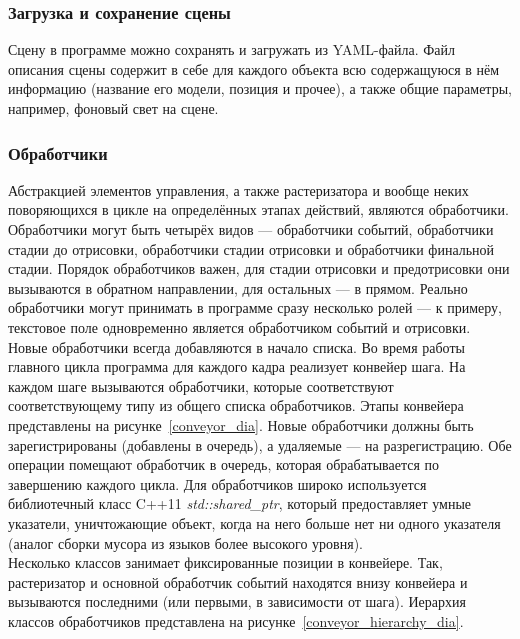 \documentclass[a4paper,12pt]{report}
\numberwithin{equation}{section}
\begin{document}
\subsubsection{Загрузка и сохранение сцены}
Сцену в программе можно сохранять и загружать из YAML-файла. Файл описания сцены содержит в себе для каждого объекта всю содержащуюся в нём информацию (название его модели, позиция и прочее), а также общие параметры, например, фоновый свет на сцене.

\subsubsection{Обработчики}
Абстракцией элементов управления, а также растеризатора и вообще неких поворяющихся в цикле на определённых этапах действий, являются обработчики. Обработчики могут быть четырёх видов --- обработчики событий, обработчики стадии до отрисовки, обработчики стадии отрисовки и обработчики финальной стадии. Порядок обработчиков важен, для стадии отрисовки и предотрисовки они вызываются в обратном направлении, для остальных --- в прямом. Реально обработчики могут принимать в программе сразу несколько ролей --- к примеру, текстовое поле одновременно является обработчиком событий и отрисовки. Новые обработчики всегда добавляются в начало списка. Во время работы главного цикла программа для каждого кадра реализует конвейер шага. На каждом шаге вызываются обработчики, которые соответствуют соответствующему типу из общего списка обработчиков. Этапы конвейера представлены на рисунке~\ref{conveyor_dia}. Новые обработчики должны быть зарегистрированы (добавлены в очередь), а удаляемые --- на разрегистрацию. Обе операции помещают обработчик в очередь, которая обрабатывается по завершению каждого цикла. Для обработчиков широко используется библиотечный класс C++11 \textit{std::shared\_ptr}, который предоставляет умные указатели, уничтожающие объект, когда на него больше нет ни одного указателя (аналог сборки мусора из языков более высокого уровня). \\
Несколько классов занимает фиксированные позиции в конвейере. Так, растеризатор и основной обработчик событий находятся внизу конвейера и вызываются последними (или первыми, в зависимости от шага). Иерархия классов обработчиков представлена на рисунке~\ref{conveyor_hierarchy_dia}.
\end{document}
